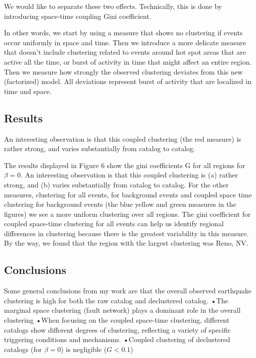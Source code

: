 \documentclass[12pt]{article} %
\theoremstyle{plain}
\begin{document}
We would like to separate these two effects. Technically, this is done
by introducing space-time coupling Gini coefficient.



In other words, we start by using a measure that shows no clustering if events occur uniformly in space and time. Then we introduce a more delicate measure that doesn't include clustering related to events around hot spot areas that are active all the time, or burst of activity in time that might affect an entire region. Then we measure how strongly the observed clustering deviates from this new (factorized) model.  All deviations represent burst of activity that are localized in time and space.

\subsection{Results}

An interesting observation is that this coupled clustering (the red measure) is rather strong, and varies substantially from catalog to catalog.


The results displayed in Figure 6 show the gini coefficients G for all regions for $\beta = 0$.  
An interesting observation is that this coupled clustering is (a) rather strong, and (b) varies substantially from catalog to catalog. For the other measures, clustering for all events, for background events and coupled space time clustering for background events (the blue yellow and green measures in the figures) we see a more uniform clustering over all regions. The gini coefficient for coupled space-time clustering for all events can help us identify regional differences in clustering because there is the greatest variability in this measure.
By the way, we found that the region with the largest clustering was Reno, NV.

\subsection{Conclusions}
Some general conclusions from my work are that the overall observed earthquake clustering is high for both the raw catalog and declustered catalog.
•The marginal space clustering (fault network) plays a dominant role in the overall clustering
•When focusing on the coupled space-time clustering, different catalogs show different degrees of clustering, reflecting a variety of specific triggering conditions and mechanisms.
•Coupled clustering of declustered catalogs (for $\beta = 0$) is negligible ($G < 0.1$)
\end{document}
